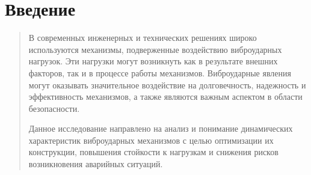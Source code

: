 \section{Введение}

\begin{quotation}
В современных инженерных и технических решениях широко используются механизмы, подверженные воздействию виброударных нагрузок. Эти нагрузки могут возникнуть как в результате внешних факторов, так и в процессе работы механизмов. Виброударные явления могут оказывать значительное воздействие на долговечность, надежность и эффективность механизмов, а также являются важным аспектом в области безопасности.

Данное исследование направлено на анализ и понимание динамических характеристик виброударных механизмов с целью оптимизации их конструкции, повышения стойкости к нагрузкам и снижения рисков возникновения аварийных ситуаций.
\end{quotation}
